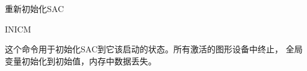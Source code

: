 \label{cmd:inicm}

重新初始化SAC

\begin{SACSTX}
INICM
\end{SACSTX}

这个命令用于初始化SAC到它该启动的状态。所有激活的图形设备中终止，
全局变量初始化到初始值，内存中数据丢失。
